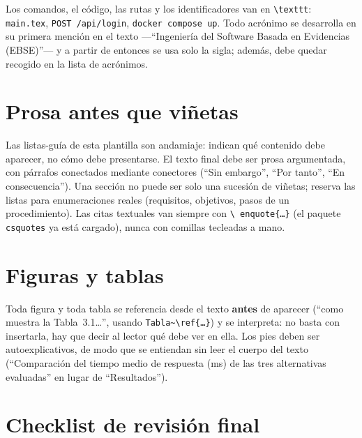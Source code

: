 Los comandos, el código, las rutas y los identificadores van en
\texttt{\textbackslash texttt}: \texttt{main.tex}, \texttt{POST
/api/login}, \texttt{docker compose up}. Todo acrónimo se desarrolla en
su primera mención en el texto ---\enquote{Ingeniería del Software Basada
en Evidencias (EBSE)}--- y a partir de entonces se usa solo la sigla;
además, debe quedar recogido en la lista de acrónimos.

\section*{Prosa antes que viñetas}

Las listas-guía de esta plantilla son andamiaje: indican qué contenido
debe aparecer, no cómo debe presentarse. El texto final debe ser prosa
argumentada, con párrafos conectados mediante conectores (\enquote{Sin
embargo}, \enquote{Por tanto}, \enquote{En consecuencia}). Una sección no
puede ser solo una sucesión de viñetas; reserva las listas para
enumeraciones reales (requisitos, objetivos, pasos de un procedimiento).
Las citas textuales van siempre con \texttt{\textbackslash
enquote\{\dots\}} (el paquete \texttt{csquotes} ya está cargado), nunca
con comillas tecleadas a mano.

\section*{Figuras y tablas}

Toda figura y toda tabla se referencia desde el texto \textbf{antes} de
aparecer (\enquote{como muestra la Tabla~3.1\dots}, usando
\texttt{Tabla\textasciitilde\textbackslash ref\{\dots\}}) y se interpreta:
no basta con insertarla, hay que decir al lector qué debe ver en ella.
Los pies deben ser autoexplicativos, de modo que se entiendan sin leer el
cuerpo del texto (\enquote{Comparación del tiempo medio de respuesta (ms)
de las tres alternativas evaluadas} en lugar de \enquote{Resultados}).

\section*{Checklist de revisión final}

